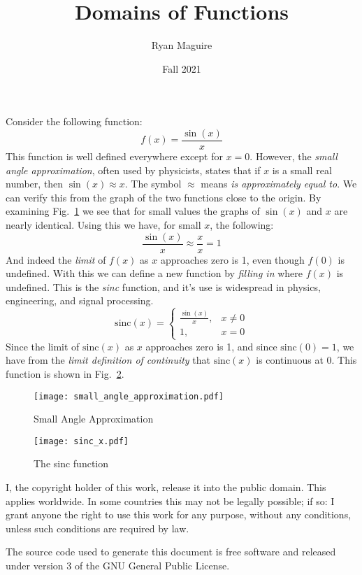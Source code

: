 \documentclass{article}
\title{Domains of Functions}
\author{Ryan Maguire}
\date{Fall 2021}
\begin{document}
    \maketitle
    Consider the following function:
    \begin{equation}
        f(x)=\frac{\sin(x)}{x}
    \end{equation}
    This function is well defined everywhere except for $x=0$. However, the
    \textit{small angle approximation}, often used by physicists, states that
    if $x$ is a small real number, then $\sin(x)\approx{x}$. The symbol
    $\approx$ means \textit{is approximately equal to}. We can verify this
    from the graph of the two functions close to the origin. By examining
    Fig.~\ref{fig:small_angle_approx} we see that for small values the graphs
    of $\sin(x)$ and $x$ are nearly identical. Using this we have, for
    small $x$, the following:
    \begin{equation}
        \frac{\sin(x)}{x}\approx\frac{x}{x}=1
    \end{equation}
    And indeed the \textit{limit} of $f(x)$ as $x$ approaches zero is 1, even
    though $f(0)$ is undefined. With this we can define a new function by
    \textit{filling in} where $f(x)$ is undefined. This is the
    \textit{sinc} function, and it's use is widespread in physics, engineering,
    and signal processing.
    \begin{equation}
        \textrm{sinc}(x)=
        \begin{cases}
            \frac{\sin(x)}{x},&x\ne{0}\\
            1,&x=0
        \end{cases}
    \end{equation}
    Since the limit of $\textrm{sinc}(x)$ as $x$ approaches zero is 1, and
    since $\textrm{sinc}(0)=1$, we have from the
    \textit{limit definition of continuity} that $\textrm{sinc}(x)$ is
    continuous at 0. This function is shown in
    Fig.~\ref{fig:sinc_x}.
    \begin{figure}
        \centering
        \texttt{[image: small\_angle\_approximation.pdf]}
        \caption{Small Angle Approximation}
        \label{fig:small_angle_approx}
    \end{figure}
    \begin{figure}
        \centering
        \texttt{[image: sinc\_x.pdf]}
        \caption{The sinc function}
        \label{fig:sinc_x}
    \end{figure}
    \newpage
    I, the copyright holder of this work, release it into the public domain.
    This applies worldwide. In some countries this may not be legally possible;
    if so: I grant anyone the right to use this work for any purpose, without
    any conditions, unless such conditions are required by law.
    \par\hfill\par
    The source code used to generate this document is free software and released
    under version 3 of the GNU General Public License.
\end{document}
